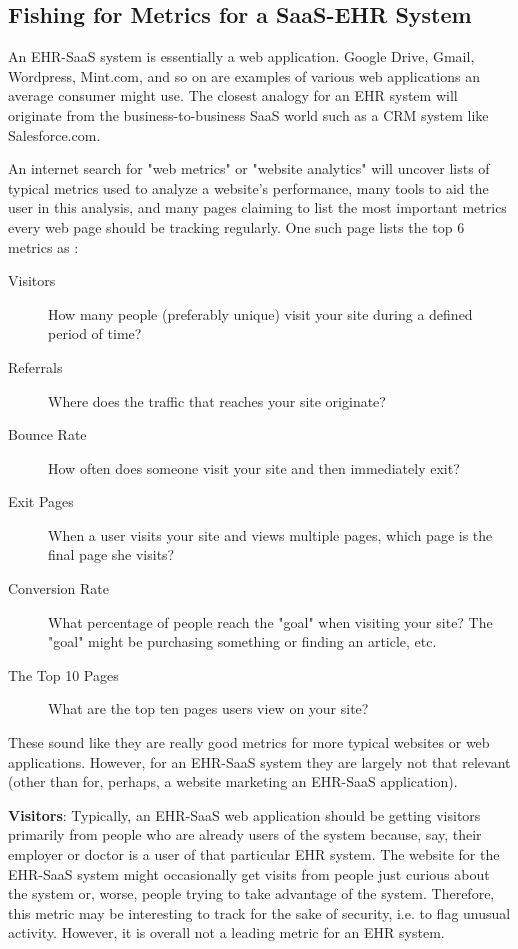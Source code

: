 \documentclass[10pt]{article}
\begin{document}
\subsection{Fishing for Metrics for a SaaS-EHR System}
\label{sec:EHR-SaaS-Metrics}

An EHR-SaaS system is essentially a web application.
Google Drive, Gmail, Wordpress, Mint.com, and so on are examples of various web applications an average consumer might use.
The closest analogy for an EHR system will originate from the business-to-business SaaS world such as a CRM system like Salesforce.com.

An internet search for "web metrics" or "website analytics" will uncover lists of typical metrics used to analyze a website's performance, many tools to aid the user in this analysis, and many pages claiming to list the most important metrics every web page should be tracking regularly.
One such page lists the top 6 metrics as \cite{top-6-metrics}:
\begin{description}
	\item[Visitors] How many people (preferably unique) visit your site during a defined period of time?
	\item[Referrals] Where does the traffic that reaches your site originate?
	\item[Bounce Rate] How often does someone visit your site and then immediately exit?
	\item[Exit Pages] When a user visits your site and views multiple pages, which page is the final page she visits?
	\item[Conversion Rate] What percentage of people reach the "goal" when visiting your site? The "goal" might be purchasing something or finding an article, etc.
	\item[The Top 10 Pages] What are the top ten pages users view on your site?
\end{description}

These sound like they are really good metrics for more typical websites or web applications.
However, for an EHR-SaaS system they are largely not that relevant (other than for, perhaps, a website marketing an EHR-SaaS application).

\textbf{Visitors}: Typically, an EHR-SaaS web application should be getting visitors primarily from people who are already users of the system because, say, their employer or doctor is a user of that particular EHR system.
The website for the EHR-SaaS system might occasionally get visits from people just curious about the system or, worse, people trying to take advantage of the system.
Therefore, this metric may be interesting to track for the sake of security, i.e. to flag unusual activity.
However, it is overall not a leading metric for an EHR system.
\end{document}

